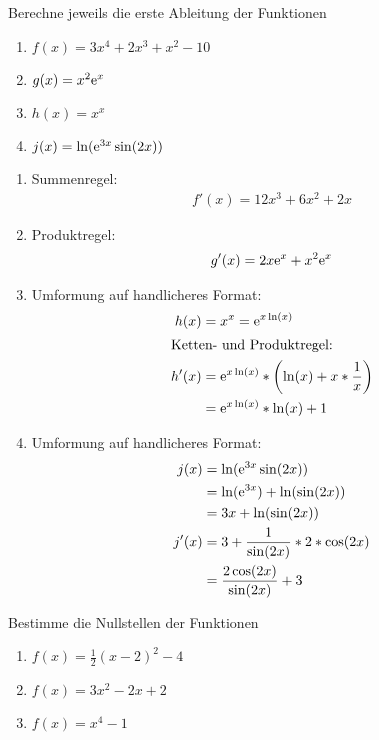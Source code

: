  Berechne jeweils die erste Ableitung der Funktionen
\begin{multicols}{2}
	\begin{enumerate}
		\item $f(x)=3x^4+2x^3+x^2-10$
	  \item $g(x)=x^2\mathrm{e}^x$
		\item $h(x)=x^x$
	  \item $j(x)=\ln(\mathrm{e}^{3x}\sin(2x))$
	\end{enumerate}
\end{multicols}

\begin{lsg}{}
	\begin{multicols}{2}
		\begin{enumerate}
			\item Summenregel: \begin{align*}
			f'(x)=12x^3+6x^2+2x
			\end{align*}
			\item Produktregel: \begin{align*}
			g'(x)=2x\mathrm{e}^x+x^2\mathrm{e}^x
			\end{align*}
			\item Umformung auf handlicheres Format: \begin{align*}
		    h(x)&= x^x= \mathrm{e}^{x\ln(x)}\\
		    \intertext{Ketten- und Produktregel: }
				h'(x)&=\mathrm{e}^{x\ln(x)}* \left(\ln(x)+x*\frac{1}{x}\right) \\
				&= \mathrm{e}^{x\ln(x)}*\ln(x)+1
		  \end{align*}
		  \item Umformung auf handlicheres Format: \begin{align*}
		    j(x)&= \ln(\mathrm{e}^{3x}\sin(2x))\\
				&= \ln(\mathrm{e}^{3x}) + \ln(\sin(2x)) \\
				&= 3x + \ln(\sin(2x))\\
		    j'(x)&=3+\frac{1}{\sin(2x)} * 2*\cos(2x) \\
				&= \frac{2\cos(2x)}{\sin(2x)}+3
		  \end{align*}
		\end{enumerate}
	\end{multicols}
\end{lsg}






 Bestimme die Nullstellen der Funktionen
\begin{multicols}{3}
  \begin{enumerate}
    \item $f(x) = \frac 1 2 (x-2)^2 -4$
    \item $f(x) = 3x^2-2x+2$
    \item $f(x) = x^4-1$
  \end{enumerate}
\end{multicols}

